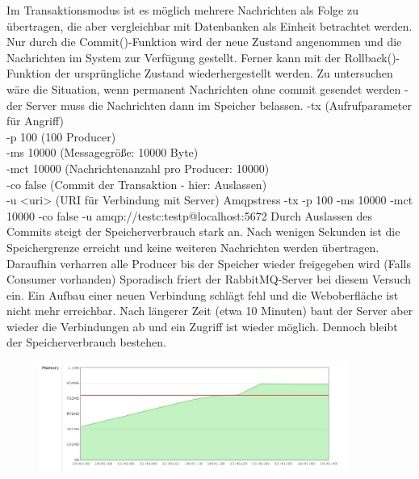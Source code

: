 \documentclass[	a4paper,
			11pt,
			titlepage,
			oneside,
			fleqn,
			listof=totoc,
			parskip,
			numbers=noenddot]{scrartcl}
\begin{document}
\clearpage
		{Im Transaktionsmodus ist es möglich mehrere Nachrichten als Folge zu übertragen, die aber vergleichbar mit Datenbanken als Einheit betrachtet werden. Nur durch die Commit()-Funktion wird der neue Zustand angenommen und die Nachrichten im System zur Verfügung gestellt. Ferner kann mit der Rollback()-Funktion der ursprüngliche Zustand wiederhergestellt werden. Zu untersuchen wäre die Situation, wenn permanent Nachrichten ohne commit gesendet werden - der Server muss die Nachrichten dann im Speicher belassen. }%
		{%
		 -tx (Aufrufparameter für Angriff) \\
		 -p 100 (100 Producer) \\
		 -ms 10000 (Messagegröße: 10000 Byte) \\
		 -mct 10000 (Nachrichtenanzahl pro Producer: 10000) \\
		 -co false (Commit der Transaktion - hier: Auslassen) \\
		 -u <uri> (URI für Verbindung mit Server)
		}%
		{Amqpstress -tx -p 100 -ms 10000 -mct 10000 -co false -u amqp://testc:testp@localhost:5672}%
		{Durch Auslassen des Commits steigt der Speicherverbrauch stark an. Nach wenigen Sekunden ist die Speichergrenze erreicht und keine weiteren Nachrichten werden übertragen. Daraufhin verharren alle Producer bis der Speicher wieder freigegeben wird (Falls Consumer vorhanden) }
		{Sporadisch friert der RabbitMQ-Server bei diesem Versuch ein. Ein Aufbau einer neuen Verbindung schlägt fehl und die Weboberfläche ist nicht mehr erreichbar. Nach längerer Zeit (etwa 10 Minuten) baut der Server aber wieder die Verbindungen ab und ein Zugriff ist wieder möglich. Dennoch bleibt der Speicherverbrauch bestehen.}

\begin{figure}[H]
	\vspace{0.5cm}
	\centering
	\includegraphics[width=0.9\textwidth]{img/commit/noCommit100p}
\end{figure}
\end{document}
